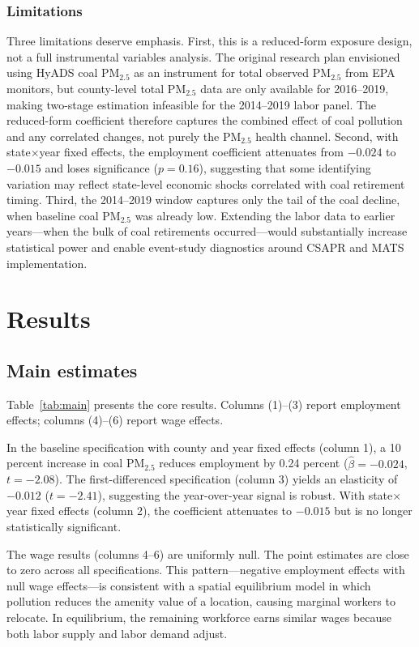 \documentclass[12pt]{article}
\begin{document}
\subsubsection*{Limitations} Three limitations deserve emphasis. First, this is a reduced-form exposure design, not a full instrumental variables analysis. The original research plan envisioned using HyADS coal PM$_{2.5}$ as an instrument for total observed PM$_{2.5}$ from EPA monitors, but county-level total PM$_{2.5}$ data are only available for 2016--2019, making two-stage estimation infeasible for the 2014--2019 labor panel. The reduced-form coefficient therefore captures the combined effect of coal pollution and any correlated changes, not purely the PM$_{2.5}$ health channel. Second, with state$\times$year fixed effects, the employment coefficient attenuates from $-0.024$ to $-0.015$ and loses significance ($p=0.16$), suggesting that some identifying variation may reflect state-level economic shocks correlated with coal retirement timing. Third, the 2014--2019 window captures only the tail of the coal decline, when baseline coal PM$_{2.5}$ was already low. Extending the labor data to earlier years---when the bulk of coal retirements occurred---would substantially increase statistical power and enable event-study diagnostics around CSAPR and MATS implementation.

\section{Results}

\subsection{Main estimates}

Table~\ref{tab:main} presents the core results. Columns (1)--(3) report employment effects; columns (4)--(6) report wage effects.



In the baseline specification with county and year fixed effects (column 1), a 10 percent increase in coal PM$_{2.5}$ reduces employment by 0.24 percent ($\hat{\beta}=-0.024$, $t=-2.08$). The first-differenced specification (column 3) yields an elasticity of $-0.012$ ($t=-2.41$), suggesting the year-over-year signal is robust. With state$\times$year fixed effects (column 2), the coefficient attenuates to $-0.015$ but is no longer statistically significant.

The wage results (columns 4--6) are uniformly null. The point estimates are close to zero across all specifications. This pattern---negative employment effects with null wage effects---is consistent with a spatial equilibrium model in which pollution reduces the amenity value of a location, causing marginal workers to relocate. In equilibrium, the remaining workforce earns similar wages because both labor supply and labor demand adjust.
\end{document}
